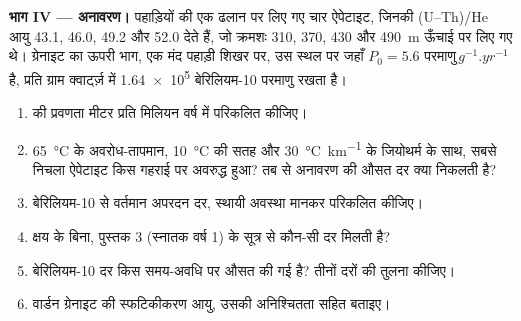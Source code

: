 \begin{problem}
\medskip\noindent\textbf{भाग IV --- अनावरण।} पहाड़ियों की एक ढलान पर लिए गए चार ऐपेटाइट,
जिनकी (U--Th)/He आयु 43.1, 46.0, 49.2 और
\qty{52.0}{\Ma} देते हैं, जो क्रमशः 310, 370, 430 और \qty{490}{m} ऊँचाई पर लिए गए थे। ग्रेनाइट का ऊपरी भाग,
एक मंद पहाड़ी शिखर पर, उस स्थल पर जहाँ $P_0 = \num{5.6}\text{ परमाणु}\,\unit{g^{-1}.yr^{-1}}$ है,
प्रति ग्राम क्वार्ट्ज़ में \num{1.64e5} बेरिलियम-10 परमाणु रखता है।
\begin{enumerate}[resume]
\item {} की प्रवणता मीटर प्रति
मिलियन वर्ष में परिकलित कीजिए।
\item \qty{65}{\celsius} के अवरोध-तापमान, \qty{10}{\celsius} की सतह
और \qty{30}{\celsius.km^{-1}} के जियोथर्म के साथ, सबसे निचला ऐपेटाइट किस गहराई पर अवरुद्ध हुआ?
तब से अनावरण की औसत दर क्या निकलती है?
\item बेरिलियम-10 से वर्तमान अपरदन दर, स्थायी
अवस्था मानकर परिकलित कीजिए।
\item क्षय के बिना, पुस्तक 3 (स्नातक वर्ष 1) के सूत्र से कौन-सी दर मिलती है?
\item बेरिलियम-10 दर किस समय-अवधि पर औसत की गई है? तीनों
दरों की तुलना कीजिए।
\item वार्डन ग्रेनाइट की स्फटिकीकरण आयु, उसकी
अनिश्चितता सहित बताइए।
\end{enumerate}
\end{problem}
